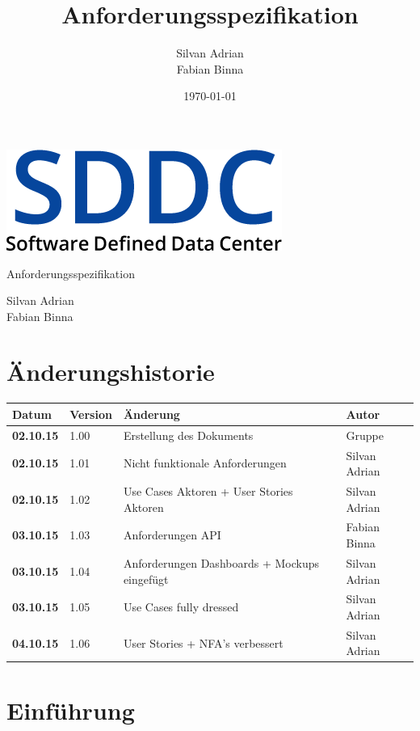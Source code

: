 \documentclass[11pt]{scrartcl}
\title{Anforderungsspezifikation}
\author{Silvan Adrian \\ Fabian Binna}
\date{\today{}}
\begin{document}
\def\arraystretch{1.5}
\begin{titlepage}
\begin{center}
\vspace{10em}
\includegraphics[scale=2]{SDDC}
\vspace{10em}
\end{center}
\begin{center}
\huge {Anforderungsspezifikation}
\end{center}
\begin{center}
\vspace{10em}
\LARGE {Silvan Adrian} \\
\LARGE {Fabian Binna}
\end{center}

\end{titlepage}

\newpage
\section{Änderungshistorie}
\begin{tabularx}{\linewidth}{l l X l}
\textbf{Datum} & \textbf{Version} & \textbf{Änderung}  & \textbf{Autor} \\
\hline
\textbf{02.10.15} & 1.00 & Erstellung des Dokuments & Gruppe \\
\textbf{02.10.15} & 1.01 & Nicht funktionale Anforderungen & Silvan Adrian\\
\textbf{02.10.15} & 1.02 & Use Cases Aktoren + User Stories Aktoren & Silvan 
Adrian\\
\textbf{03.10.15} & 1.03 & Anforderungen API & Fabian Binna\\
\textbf{03.10.15} & 1.04 & Anforderungen Dashboards + Mockups eingefügt & Silvan 
Adrian\\
\textbf{03.10.15} & 1.05 & Use Cases fully dressed & Silvan Adrian\\
\textbf{04.10.15} & 1.06 & User Stories + NFA's verbessert & Silvan Adrian\\
\end{tabularx}

\newpage
\tableofcontents
\newpage

\section{Einführung}
\end{document}
